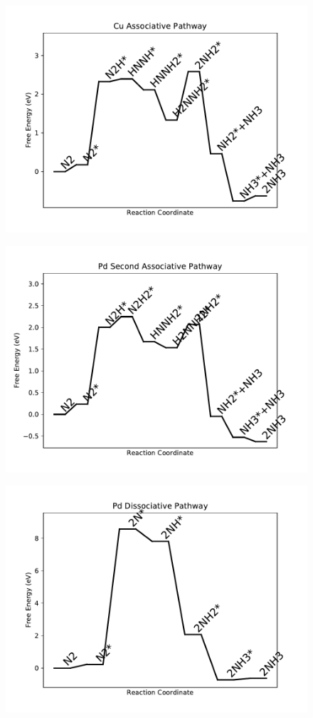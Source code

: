 \begin{figure}
\includegraphics[width=0.8\linewidth]{data/plots/Cu_associative.pdf}
\end{figure}

\begin{figure}
\includegraphics[width=0.8\linewidth]{data/plots/Pd_associative_2.pdf}
\end{figure}

\begin{figure}
\includegraphics[width=0.8\linewidth]{data/plots/Pd_dissociative.pdf}
\end{figure}

